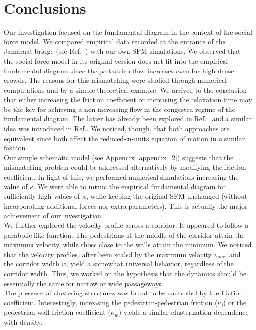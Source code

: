 \section{\label{conclusions}Conclusions}

Our investigation focused on the fundamental diagram in the context of the 
social force model. We compared empirical data recorded at 
the entrance of the Jamaraat bridge (see Ref.~\cite{helbing3}) with our own SFM 
simulations. We observed  that the  social force model in its 
original version does not fit into the empirical fundamental 
diagram since the pedestrian flow increases even for high dense 
crowds. The reasons for this mismatching were studied through 
numerical computations and by a simple theoretical example. We arrived to the 
conclusion that either increasing the friction coefficient or increasing the 
relaxation time may be the key for achieving a non-increasing 
flow in the congested regime of the fundamental diagram. The 
latter has already been explored in Ref.~\cite{johansson} and a 
similar idea was introduced in Ref.\cite{parisi2}. We noticed, 
though, that both approaches are equivalent since both affect 
the reduced-in-units equation of motion in a similar fashion.\\

Our simple schematic model (see Appendix \ref{appendix_2}) suggests 
that the mismatching problem could be addressed 
alternatively by  modifying the friction coefficient. In light 
of this, we performed numerical simulations increasing the 
value of $\kappa$. We were able to mimic the empirical 
fundamental diagram for sufficiently high values of $\kappa$, {\color{red}
while keeping the original SFM unchanged (without incorporating additional forces nor extra parameters)}. 
This is actually the major achievement of our investigation. \\

We further explored the velocity profile 
across a corridor. It appeared to follow a parabolic-like 
function. The pedestrians at the middle of the 
corridor attain the maximum velocity, while those close to the 
walls attain the minimum. We noticed that the 
velocity profiles, after been scaled by the maximum velocity $v_{max}$ and the 
corridor width $w$, yield a somewhat universal behavior, 
regardless of the corridor width. Thus, we worked on the 
hypothesis that the dynamics should be essentially the same for narrow or wide 
passageways. \\

The presence of clustering structures was found to be controlled 
by the friction coefficient. Interestingly, increasing the 
pedestrian-pedestrian friction ($\kappa_i$) or the pedestrian-wall friction 
coefficient ($\kappa_w$) yields a similar clusterization dependence with 
density.\\

